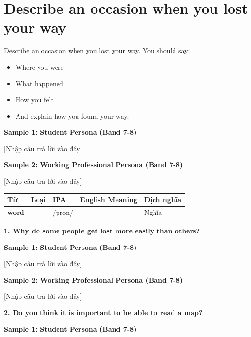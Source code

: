 \section{Describe an occasion when you lost your way}
\begin{ieltsprompt}
Describe an occasion when you lost your way.
You should say:
\begin{itemize}[leftmargin=2em, itemsep=2pt]
\item Where you were
\item What happened
\item How you felt
\item And explain how you found your way.
\end{itemize}
\end{ieltsprompt}
\begin{ieltsanswer}
\textbf{Sample 1: Student Persona (Band 7-8)}

[Nhập câu trả lời vào đây]

\textbf{Sample 2: Working Professional Persona (Band 7-8)}

[Nhập câu trả lời vào đây]
\end{ieltsanswer}


\vspace{0.8em}
\begin{center}
\renewcommand{\arraystretch}{1.65}
\begin{tabularx}{\textwidth}{|V{0.22\textwidth}|C{0.07\textwidth}|I{0.20\textwidth}|Y|V{0.18\textwidth}|}
\hline
{}
\textbf{Từ} & \textbf{Loại} & \textbf{IPA} & \textbf{English Meaning} & \textbf{Dịch nghĩa} \\
\hline
\textbf{word} & & /pron/ & & Nghĩa \\ \hline
\end{tabularx}
\end{center}

\partthreeheader

\begin{ieltsquestion}
\textbf{1. Why do some people get lost more easily than others?}
\end{ieltsquestion}
\textbf{Sample 1: Student Persona (Band 7-8)}

[Nhập câu trả lời vào đây]

\textbf{Sample 2: Working Professional Persona (Band 7-8)}

[Nhập câu trả lời vào đây]

\separator

\begin{ieltsquestion}
\textbf{2. Do you think it is important to be able to read a map?}
\end{ieltsquestion}
\textbf{Sample 1: Student Persona (Band 7-8)}

